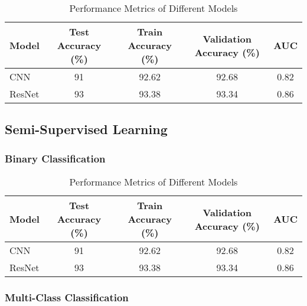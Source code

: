 \documentclass{article}
\begin{document}
\renewcommand{\arraystretch}{1.2} 
\begin{table}[h!] %
    \centering %
    \caption{Performance Metrics of Different Models} %
    \label{tab:fully_binary_perf} %
    \begin{tabular}{|l|c|c|c|c|}
        \hline
        Model & Test Accuracy (\%) & Train Accuracy (\%) & Validation Accuracy (\%) & AUC \\
        \hline
        CNN & 91 & 92.62 & 92.68 & 0.82 \\
        ResNet & 93 & 93.38 & 93.34 & 0.86 \\
        \hline
    \end{tabular}
\end{table}

\subsection{Semi-Supervised Learning}

\subsubsection{Binary Classification}

\renewcommand{\arraystretch}{1.2} 
\begin{table}[h!] %
    \centering %
    \caption{Performance Metrics of Different Models} %
    \label{tab:fully_binary_perf} %
    \begin{tabular}{|l|c|c|c|c|}
        \hline
        Model & Test Accuracy (\%) & Train Accuracy (\%) & Validation Accuracy (\%) & AUC \\
        \hline
        CNN & 91 & 92.62 & 92.68 & 0.82 \\
        ResNet & 93 & 93.38 & 93.34 & 0.86 \\
        \hline
    \end{tabular}
\end{table}

\subsubsection{Multi-Class Classification}
\end{document}
